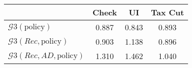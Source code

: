 \begin{tabular}{@{}lccc@{}} 
\toprule 
                          & Check      & UI    & Tax Cut    \\  \midrule 
$\mathcal{G}3(\text{policy})$ & 0.887  & 0.843  & 0.893     \\ 
$\mathcal{G}3(Rec,\text{policy})$ & 0.903  & 1.138  & 0.896     \\ 
$\mathcal{G}3(Rec, AD,\text{policy})$ & 1.310  & 1.462  & 1.040     \\ 
\end{tabular}  
